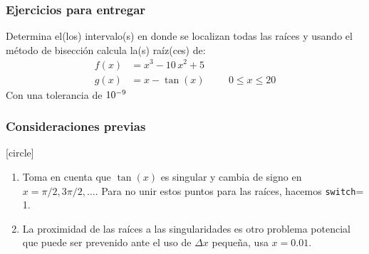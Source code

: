 \begin{frame}
\frametitle{Ejercicios para entregar}
Determina el(los) intervalo(s) en donde se localizan todas las raíces y usando el método de bisección calcula la(s) raíz(ces) de:
\begin{align*}
f(x) &= x^{3} - 10 \, x^{2} + 5 \\[0.5em]
g(x) &= x - \tan(x) \hspace{1cm} 0 \leq x \leq 20
\end{align*}
Con una tolerancia de $\num{d-9}$
\end{frame}
\begin{frame}
\frametitle{Consideraciones previas}
[circle]
\begin{enumerate}[<+->]
\item Toma en cuenta que $\tan(x)$ es singular y cambia de signo en $x = \pi/2, 3\pi/2,\ldots$. Para no unir estos puntos para las raíces, hacemos \texttt{switch}= 1.
\item La proximidad de las raíces a las singularidades es otro problema potencial que puede ser prevenido ante el uso de $\Delta x$ pequeña, usa $x = 0.01$.
\end{enumerate}
\end{frame}
